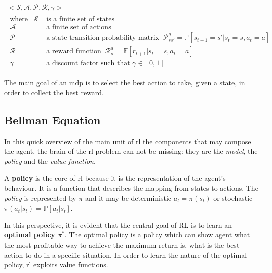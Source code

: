  \begin{equation}\label{eq:mdp}
 \begin{gathered} 
 <\mathcal{S}, \mathcal{A}, \mathcal{P}, \mathcal{R}, \gamma>\\
 \begin{aligned}
 	\text{where}\hspace{10pt} \mathcal{S} & \text{ is a finite set of states} \\
 	\mathcal{A} & \text{ a finite set of actions} \\
 	\mathcal{P} & \text{ a state transition probability matrix}\;\;
 	 \mathcal{P}_{ss'}^a = \mathbb{P}[s_{t+1}= s' | s_t = s, a_t = a]\\
 	\mathcal{R} & \text{ a reward function}
 	 	\;\; \mathcal{R}_{s}^a = \mathbb{E}[r_{t+1} | s_t = s, a_t = a] \\
 	 \gamma & \text{ a discount factor such that } \gamma \in [0,1]
 \end{aligned}
 \end{gathered}
 \end{equation}


The main goal of an \acrshort{mdp} is to select the best action to take, given a state, in order to collect the best reward. 

\subsection{Bellman Equation}

In this quick overview of the main unit of \acrshort{rl} the components that may compose the agent, the brain of the \acrshort{rl} problem can not be missing: they are the \textit{model}, the \textit{policy} and the \textit{value function}.


A \textbf{policy} is the core of \acrshort{rl} because it is the representation of the agent's behaviour. It is a function that describes the mapping from states to actions.  The \textit{policy} is represented by $\pi$ and it may be deterministic  $a_t = \pi(s_t)$  or stochastic $\pi(a_t|s_t) = \mathbb{P}[a_t | s_t]$.

In this perspective, it is evident that the central goal of RL is to learn an \textbf{optimal policy $\pi^*$}. The optimal policy is a policy which can show agent what the most profitable way to achieve the maximum return is, what is the best action to do in a specific situation. In order to learn the nature of the optimal policy, \acrshort{rl} exploits value functions.


